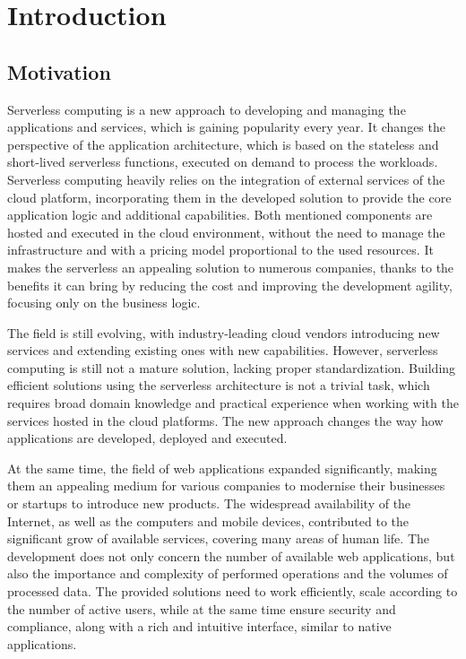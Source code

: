 \chapter{Introduction}

\section{Motivation}

Serverless computing is a new approach to developing and managing the applications and services, which is gaining popularity every year.
It changes the perspective of the application architecture, which is based on the stateless and short-lived serverless functions, executed on demand to process the workloads.
Serverless computing heavily relies on the integration of external services of the cloud platform, incorporating them in the developed solution to provide the core application logic and additional capabilities.
Both mentioned components are hosted and executed in the cloud environment, without the need to manage the infrastructure and with a pricing model proportional to the used resources.
It makes the serverless an appealing solution to numerous companies, thanks to the benefits it can bring by reducing the cost and improving the development agility, focusing only on the business logic.

The field is still evolving, with industry-leading cloud vendors introducing new services and extending existing ones with new capabilities.
However, serverless computing is still not a mature solution, lacking proper standardization.
Building efficient solutions using the serverless architecture is not a trivial task, which requires broad domain knowledge and practical experience when working with the services hosted in the cloud platforms.
The new approach changes the way how applications are developed, deployed and executed.

At the same time, the field of web applications expanded significantly, making them an appealing medium for various companies to modernise their businesses or startups to introduce new products.
The widespread availability of the Internet, as well as the computers and mobile devices, contributed to the significant grow of available services, covering many areas of human life.
The development does not only concern the number of available web applications, but also the importance and complexity of performed operations and the volumes of processed data.
The provided solutions need to work efficiently, scale according to the number of active users, while at the same time ensure security and compliance, along with a rich and intuitive interface, similar to native applications.

